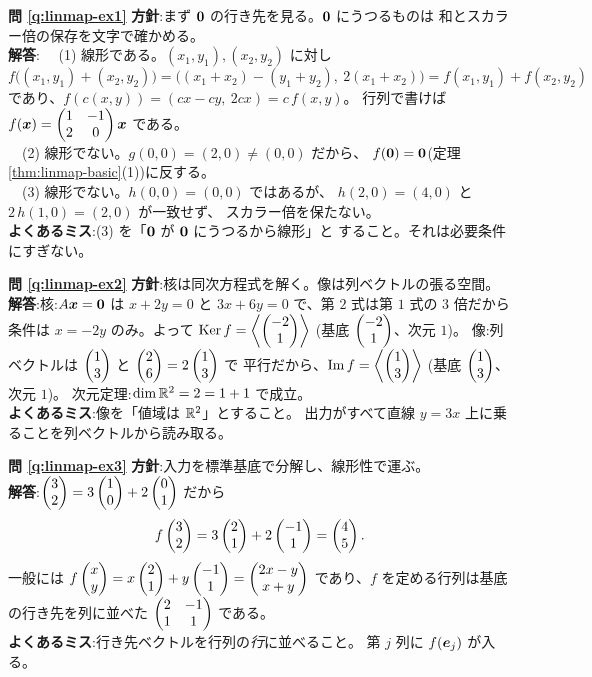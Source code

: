 \bigskip
\noindent\textbf{問 \ref{q:linmap-ex1}}\quad
\textbf{方針}:まず $\bm{0}$ の行き先を見る。$\bm{0}$ にうつるものは
和とスカラー倍の保存を文字で確かめる。\\
\textbf{解答}:
　(1) 線形である。$(x_1, y_1), (x_2, y_2)$ に対し
\[
f\bigl((x_1, y_1) + (x_2, y_2)\bigr)
= \bigl((x_1 + x_2) - (y_1 + y_2),\ 2(x_1 + x_2)\bigr)
= f(x_1, y_1) + f(x_2, y_2)
\]
であり、$f(c(x, y)) = (cx - cy,\ 2cx) = c\,f(x, y)$。
行列で書けば $f(\bm{x}) = \begin{pmatrix}1 & -1 \\ 2 & 0\end{pmatrix}\bm{x}$ である。\\
　(2) 線形でない。$g(0, 0) = (2, 0) \neq (0, 0)$ だから、
$f(\bm{0}) = \bm{0}$(定理 \ref{thm:linmap-basic}(1))に反する。\\
　(3) 線形でない。$h(0,0) = (0,0)$ ではあるが、
$h(2, 0) = (4, 0)$ と $2\,h(1, 0) = (2, 0)$ が一致せず、
スカラー倍を保たない。\\
\textbf{よくあるミス}:(3) を「$\bm{0}$ が $\bm{0}$ にうつるから線形」と
すること。それは必要条件にすぎない。

\bigskip
\noindent\textbf{問 \ref{q:linmap-ex2}}\quad
\textbf{方針}:核は同次方程式を解く。像は列ベクトルの張る空間。\\
\textbf{解答}:核:$A\bm{x} = \bm{0}$ は $x + 2y = 0$ と
$3x + 6y = 0$ で、第 $2$ 式は第 $1$ 式の $3$ 倍だから条件は
$x = -2y$ のみ。よって
$\mathrm{Ker}\,f = \left\langle \begin{pmatrix}-2 \\ 1\end{pmatrix} \right\rangle$
(基底 $\begin{pmatrix}-2 \\ 1\end{pmatrix}$、次元 $1$)。
像:列ベクトルは $\begin{pmatrix}1 \\ 3\end{pmatrix}$ と $\begin{pmatrix}2 \\ 6\end{pmatrix} = 2\begin{pmatrix}1 \\ 3\end{pmatrix}$ で
平行だから、$\mathrm{Im}\,f = \left\langle \begin{pmatrix}1 \\ 3\end{pmatrix} \right\rangle$
(基底 $\begin{pmatrix}1 \\ 3\end{pmatrix}$、次元 $1$)。
次元定理:$\dim \mathbb{R}^2 = 2 = 1 + 1$ で成立。\\
\textbf{よくあるミス}:像を「値域は $\mathbb{R}^2$」とすること。
出力がすべて直線 $y = 3x$ 上に乗ることを列ベクトルから読み取る。

\bigskip
\noindent\textbf{問 \ref{q:linmap-ex3}}\quad
\textbf{方針}:入力を標準基底で分解し、線形性で運ぶ。\\
\textbf{解答}:$\begin{pmatrix}3 \\ 2\end{pmatrix} = 3\begin{pmatrix}1 \\ 0\end{pmatrix} + 2\begin{pmatrix}0 \\ 1\end{pmatrix}$ だから
\[
f\begin{pmatrix}3 \\ 2\end{pmatrix} = 3\begin{pmatrix}2 \\ 1\end{pmatrix} + 2\begin{pmatrix}-1 \\ 1\end{pmatrix} = \begin{pmatrix}4 \\ 5\end{pmatrix}.
\]
一般には
$f\begin{pmatrix}x \\ y\end{pmatrix} = x\begin{pmatrix}2 \\ 1\end{pmatrix} + y\begin{pmatrix}-1 \\ 1\end{pmatrix} = \begin{pmatrix}2x - y \\ x + y\end{pmatrix}$
であり、$f$ を定める行列は基底の行き先を列に並べた
$\begin{pmatrix}2 & -1 \\ 1 & 1\end{pmatrix}$ である。\\
\textbf{よくあるミス}:行き先ベクトルを行列の\emph{行}に並べること。
第 $j$ 列に $f(\bm{e}_j)$ が入る。

